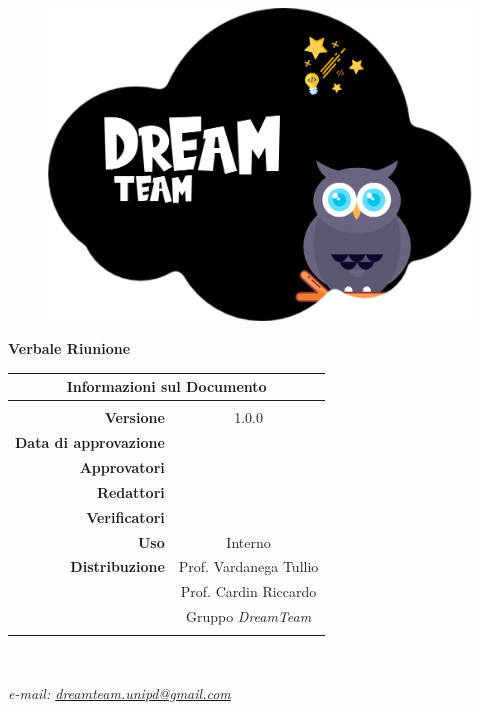 \begin{center}

	\begin{figure}
		\centering
		\includegraphics[scale=0.05]{Sezioni/images/DreamTeam.png}
	\end{figure}

	{\Huge{\textbf{Verbale Riunione \D}}} \\ [1cm]

	\begin{table}[htbp]
		\centering
		\begin{tabular}{r|c}
			\multicolumn{2}{c}{\textbf{Informazioni sul Documento}}   \\
			\hline                                                    \\
			\textbf{Versione}             & 1.0.0                     \\ \rule{0pt}{3ex}
			\textbf{Data di approvazione} &                           \\ \rule{0pt}{3ex}
			\textbf{Approvatori}          &                           \\ \rule{0pt}{3ex}
			\textbf{Redattori}            & \PV                       \\ \rule{0pt}{3ex}
			\textbf{Verificatori}         &   \GC                        \\ \rule{0pt}{3ex}
			\textbf{Uso}                  & Interno                   \\ \rule{0pt}{3ex}
			\textbf{Distribuzione}        & Prof. Vardanega Tullio    \\ \rule{0pt}{2ex}
			                              & Prof. Cardin Riccardo     \\ \rule{0pt}{2ex}
			                              & Gruppo \textit{DreamTeam} \\ \rule{0pt}{0.1cm}
		\end{tabular} \\ [0.5cm]
	\end{table}

	\textsl{ e-mail: \href{mailto:dreamteam.unipd@gmail.com}{dreamteam.unipd@gmail.com} } \\[2cm]
\end{center}
\pagebreak